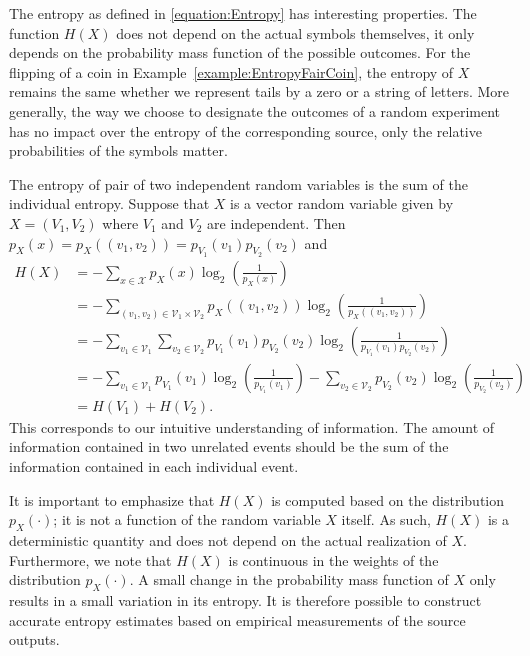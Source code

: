 The entropy as defined in \eqref{equation:Entropy} has interesting properties.
The function $H(X)$ does not depend on the actual symbols themselves, it only depends on the probability mass function of the possible outcomes.
For the flipping of a coin in Example~\ref{example:EntropyFairCoin}, the entropy of $X$ remains the same whether we represent tails by a zero or a string of letters.
More generally, the way we choose to designate the outcomes of a random experiment has no impact over the entropy of the corresponding source, only the relative probabilities of the symbols matter.

The entropy of pair of two independent random variables is the sum of the individual entropy.
Suppose that $X$ is a vector random variable given by $X = (V_1, V_2)$ where $V_1$ and $V_2$ are independent.
Then $p_X(x) = p_X((v_1, v_2)) = p_{V_1} (v_1) p_{V_2} (v_2)$ and
\begin{equation*}
\begin{split}
H(X) &= - \sum_{ x \in \mathcal{X} } p_X(x) \log_2 \left( \frac{1}{p_X(x)} \right) \\
&= - \sum_{(v_1, v_2) \in \mathcal{V}_1 \times \mathcal{V}_2}
p_X((v_1, v_2)) \log_2 \left( \frac{1}{p_X((v_1, v_2))} \right) \\
&= - \sum_{v_1 \in \mathcal{V}_1} \sum_{v_2 \in \mathcal{V}_2}
p_{V_1} (v_1) p_{V_2} (v_2) \log_2 \left( \frac{1}{p_{V_1} (v_1) p_{V_2} (v_2)} \right) \\
&= - \sum_{v_1 \in \mathcal{V}_1}
p_{V_1} (v_1) \log_2 \left( \frac{1}{p_{V_1} (v_1)} \right)
- \sum_{v_2 \in \mathcal{V}_2}
p_{V_2} (v_2) \log_2 \left( \frac{1}{p_{V_2} (v_2)} \right) \\
&= H(V_1) + H(V_2) .
\end{split}
\end{equation*}
This corresponds to our intuitive understanding of information.
The amount of information contained in two unrelated events should be the sum of the information contained in each individual event.

It is important to emphasize that $H(X)$ is computed based on the distribution $p_X(\cdot)$; it is not a function of the random variable $X$ itself.
As such, $H(X)$ is a deterministic quantity and does not depend on the actual realization of $X$.
Furthermore, we note that $H(X)$ is continuous in the weights of the distribution $p_X(\cdot)$.
A small change in the probability mass function of $X$ only results in a small variation in its entropy.
It is therefore possible to construct accurate entropy estimates based on empirical measurements of the source outputs.


